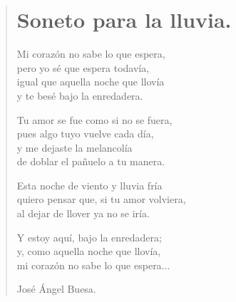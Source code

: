 \documentclass[11pt, portrait, twoside, notitlepage, openright]{book}
\begin{document}
\newpage
\begin{verse}
\begin{center}
\section{Soneto para la lluvia.}
\end{center}
Mi corazón no sabe lo que espera,\\
pero yo sé que espera todavía,\\
igual que aquella noche que llovía\\
y te besé bajo la enredadera.
\newline

Tu amor se fue como si no se fuera,\\
pues algo tuyo vuelve cada día,\\
y me dejaste la melancolía\\
de doblar el pañuelo a tu manera.
\newline

Esta noche de viento y lluvia fría\\
quiero pensar que, si tu amor volviera,\\
al dejar de llover ya no se iría.
\newline

Y estoy aquí, bajo la enredadera;\\
y, como aquella noche que llovía,\\
mi corazón no sabe lo que espera...
\newline

José Ángel Buesa.
\end{verse}
\newpage
\end{document}
